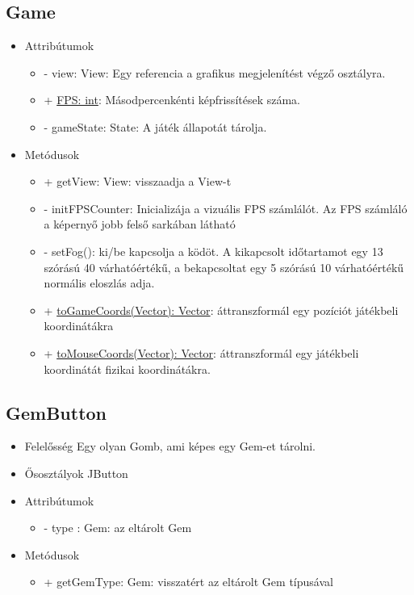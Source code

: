 \subsection{Game}
\begin{itemize}
\item Attribútumok
	\begin{itemize}
		\item - view: View: Egy referencia a grafikus megjelenítést végző osztályra.
		\item + \underline{FPS: int}: Másodpercenkénti képfrissítések száma.
		\item - gameState: State: A játék állapotát tárolja.
	\end{itemize}
	\item Metódusok
	\begin{itemize}
		\item + getView: View: visszaadja a View-t
		\item - initFPSCounter: Inicializája a vizuális FPS számlálót. Az FPS számláló a képernyő jobb felső sarkában látható
		\item - setFog(): ki/be kapcsolja a ködöt. A kikapcsolt időtartamot egy 13 szórású 40 várhatóértékű, a bekapcsoltat egy 5 szórású 10 várhatóértékű normális eloszlás adja.
		\item + \underline{toGameCoords(Vector): Vector}: áttranszformál egy pozíciót játékbeli koordinátákra
		\item + \underline{toMouseCoords(Vector): Vector}: áttranszformál egy játékbeli koordinátát fizikai koordinátákra.
	\end{itemize}
\end{itemize}


\subsection{GemButton}
\begin{itemize}
\item Felelősség \newline
Egy olyan Gomb, ami képes egy Gem-et tárolni.
\item Ősosztályok\newline
JButton
\item Attribútumok
	\begin{itemize}
		\item - type : Gem: az eltárolt Gem
	\end{itemize}
\item Metódusok
	\begin{itemize}
		\item + getGemType: Gem: visszatért az eltárolt Gem típusával
	\end{itemize}
\end{itemize}

